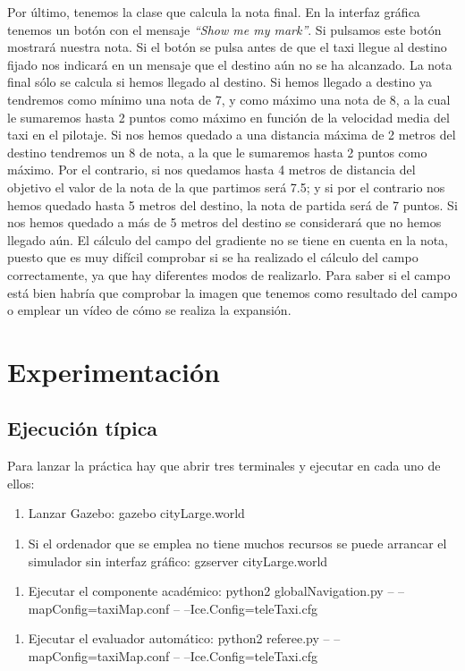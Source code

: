 Por último, tenemos la clase que calcula la nota final. En la interfaz gráfica tenemos un botón con el mensaje \textit{``Show me my mark''}. Si pulsamos este botón mostrará nuestra nota. Si el botón se pulsa antes de que el taxi llegue al destino fijado nos indicará en un mensaje que el destino aún no se ha alcanzado. La nota final sólo se calcula si hemos llegado al destino. Si hemos llegado a destino ya tendremos como mínimo una nota de 7, y como máximo una nota de 8, a la cual le sumaremos hasta 2 puntos como máximo en función de la velocidad media del taxi en el pilotaje. Si nos hemos quedado a una distancia máxima de 2 metros del destino tendremos un 8 de nota, a la que le sumaremos hasta 2 puntos como máximo. Por el contrario, si nos quedamos hasta 4 metros de distancia del objetivo el valor de la nota de la que partimos será 7.5; y si por el contrario nos hemos quedado hasta 5 metros del destino, la nota de partida será de 7 puntos. Si nos hemos quedado a más de 5 metros del destino se considerará que no hemos llegado aún. El cálculo del campo del gradiente no se tiene en cuenta en la nota, puesto que es muy difícil comprobar si se ha realizado el cálculo del campo correctamente, ya que hay diferentes modos de realizarlo. Para saber si el campo está bien habría que comprobar la imagen que tenemos como resultado del campo o emplear un vídeo de cómo se realiza la expansión.


\section{Experimentación}

\subsection{Ejecución típica}
Para lanzar la práctica hay que abrir tres terminales y ejecutar en cada uno de ellos:

\begin{enumerate}[1.]
    \item Lanzar Gazebo: gazebo cityLarge.world
\end{enumerate}
\begin{enumerate}[1b.]
\item Si el ordenador que se emplea no tiene muchos recursos se puede arrancar el simulador sin interfaz gráfico: gzserver cityLarge.world
\end{enumerate}
\begin{enumerate}[2.]
    \item Ejecutar el componente académico: python2 globalNavigation.py -- --mapConfig=taxiMap.conf -- --Ice.Config=teleTaxi.cfg
\end{enumerate}
\begin{enumerate}[3.]
  	\item Ejecutar el evaluador automático: python2 referee.py -- --mapConfig=taxiMap.conf -- --Ice.Config=teleTaxi.cfg
 \end{enumerate}

